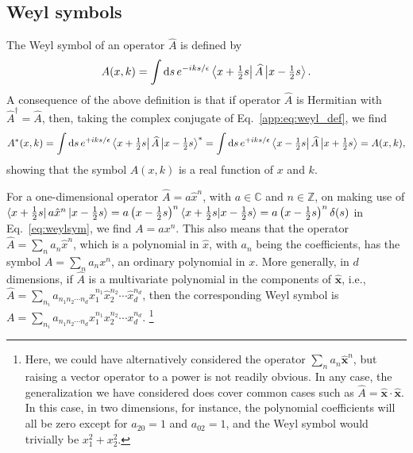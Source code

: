 \subsection{Weyl symbols}

The Weyl symbol of an operator $\widehat{A}$ is defined by
%
\begin{equation}
  A(x, k) = \int \mathrm{d}{s}\, e^{-iks/\epsilon} \left\langle x + \tfrac{1}{2}s\right|\widehat{A}\left|x - \tfrac{1}{2}s\right\rangle.
  \label{app:eq:weyl_def}
\end{equation}
%
A consequence of the above definition is that if operator $\widehat{A}$ is Hermitian with $\widehat{A}^{\dagger} = \widehat{A}$, then, taking the complex conjugate of Eq.~\eqref{app:eq:weyl_def}, we find
%
\begin{equation}
  A^{*}(x, k) = \int \mathrm{d}{s}\, e^{+iks/\epsilon} \left\langle x + \tfrac{1}{2}s\right|\widehat{A}\left|x - \tfrac{1}{2}s\right\rangle^{*}
  = \int \mathrm{d}{s}\, e^{+iks/\epsilon} \left\langle x - \tfrac{1}{2}s\right|\widehat{A}\left|x + \tfrac{1}{2}s\right\rangle = A(x, k),
  \label{eq:weylsym}
\end{equation}
%
showing that the symbol $A(x, k)$ is a real function of $x$ and $k$.

\begin{example}
  For a one-dimensional operator $\widehat{A} = a\hat{x}^{n}$, with $a \in \mathbb{C}$ and $n \in \mathbb{Z}$, on making use of $\mathinner{\langle{x + \frac{1}{2}s}\rvert}a\hat{x}^{n}\mathinner{\lvert{x - \frac{1}{2}s}\rangle} = a \left(x - \frac{1}{2}s\right)^{n}\mathinner{\langle{x + \frac{1}{2}s | x - \frac{1}{2}s}\rangle} = a\left(x - \frac{1}{2}s\right)^{n} \delta(s)$ in Eq.~\eqref{eq:weylsym}, we find $A = a x^{n}$.
  This also means that the operator $\widehat{A} = \sum_{n} a_{n}\hat{x}^{n}$, which is a polynomial in $\hat{x}$, with $a_{n}$ being the coefficients, has the symbol
  $A = \sum_{n} a_{n}{x}^{n}$, an ordinary polynomial in $x$.
  More generally, in $d$ dimensions, if $\widehat{A}$ is a multivariate polynomial in the components of $\hat{\bm{x}}$, i.e., $\widehat{A} = \sum_{n_{i}} a_{n_{1}n_{2}\cdots n_{d}} \hat{x}_{1}^{n_{1}}\hat{x}_{2}^{n_{2}}\cdots \hat{x}_{d}^{n_{d}}$, then the corresponding Weyl symbol is $A = \sum_{n_{i}} a_{n_{1}n_{2}\cdots n_{d}} {x}_{1}^{n_{1}}{x}_{2}^{n_{2}}\cdots {x}_{d}^{n_{d}}$.%
  \footnote{Here, we could have alternatively considered the operator $\sum_{n} a_{n} \hat{\bm{x}}^{n}$, but raising a vector operator to a power is not readily obvious.
    In any case, the generalization we have considered does cover common cases such as $\widehat{A} = \hat{\bm{x}}\cdot\hat{\bm{x}}$.
  In this case, in two dimensions, for instance, the polynomial coefficients will all be zero except for $a_{20} = 1$ and $a_{02} = 1$, and the Weyl symbol would trivially be $x_{1}^{2} + x_{2}^{2}$.}
\end{example}

